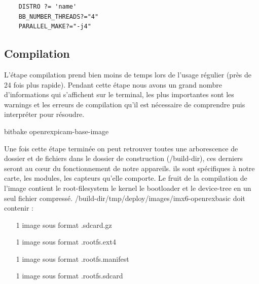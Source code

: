 	\begin{lstlisting}
	DISTRO ?= 'name'
	BB_NUMBER_THREADS?="4"
	PARALLEL_MAKE?="-j4"
	\end{lstlisting}
	\subsection{Compilation}

	L’étape compilation prend bien moins de temps lors de l’usage régulier (près
	de 24 fois plus rapide). Pendant cette étape nous avons un grand nombre
	d’informations qui s’affichent sur le terminal, les plus importantes sont les
	warnings et les erreurs de compilation qu’il est nécessaire de comprendre puis
	interpréter pour résoudre.

	\begin{tcolorbox}
		bitbake openrexpicam-base-image
	\end{tcolorbox}

	Une fois cette étape terminée on peut retrouver toutes une arborescence de dossier et de fichiers dans le dossier de construction (/build-dir), ces derniers seront au cœur du fonctionnement de notre appareils. ils sont spécifiques à notre carte, les modules, les capteurs qu’elle comporte. Le fruit de la compilation de l’image contient le root-filesystem le kernel le bootloader et le device-tree en un seul fichier compressé. /build-dir/tmp/deploy/images/imx6-openrexbasic doit contenir :

	\begin{itemize}
		\item[1 image sous format] .sdcard.gz
		\item[1 image sous format] .rootfs.ext4
		\item[1 image sous format] .rootfs.manifest
		\item[1 image sous format] .rootfs.sdcard
	\end{itemize}
